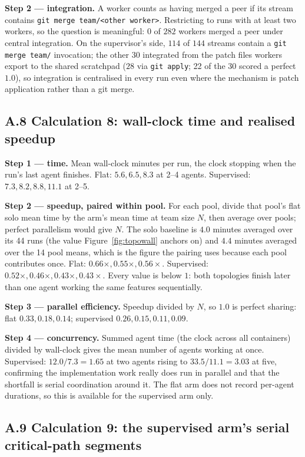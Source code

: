 \documentclass[11pt,a4paper]{article}
\begin{document}
\textbf{Step 2 --- integration.} A worker counts as having merged a peer if its stream contains \texttt{git merge team/<other worker>}. Restricting to runs with at least two workers, so the question is meaningful: $0$ of $282$ workers merged a peer under central integration. On the supervisor's side, $114$ of $144$ streams contain a \texttt{git merge team/} invocation; the other $30$ integrated from the patch files workers export to the shared scratchpad ($28$ via \texttt{git apply}; 22 of the 30 scored a perfect $1.0$), so integration is centralised in every run even where the mechanism is patch application rather than a git merge.

\subsection*{A.8 \quad Calculation 8: wall-clock time and realised speedup}

\textbf{Step 1 --- time.} Mean wall-clock minutes per run, the clock stopping when the run's last agent finishes. Flat: $5.6, 6.5, 8.3$ at 2--4 agents. Supervised: $7.3, 8.2, 8.8, 11.1$ at 2--5.

\textbf{Step 2 --- speedup, paired within pool.} For each pool, divide that pool's flat solo mean time by the arm's mean time at team size $N$, then average over pools; perfect parallelism would give $N$. The solo baseline is $4.0$ minutes averaged over its 44 runs (the value Figure~\ref{fig:topowall} anchors on) and $4.4$ minutes averaged over the 14 pool means, which is the figure the pairing uses because each pool contributes once. Flat: $0.66\times, 0.55\times, 0.56\times$. Supervised: $0.52\times, 0.46\times, 0.43\times, 0.43\times$. Every value is below $1$: both topologies finish later than one agent working the same features sequentially.

\textbf{Step 3 --- parallel efficiency.} Speedup divided by $N$, so $1.0$ is perfect sharing: flat $0.33, 0.18, 0.14$; supervised $0.26, 0.15, 0.11, 0.09$.

\textbf{Step 4 --- concurrency.} Summed agent time (the clock across all containers) divided by wall-clock gives the mean number of agents working at once. Supervised: $12.0/7.3 = 1.65$ at two agents rising to $33.5/11.1 = 3.03$ at five, confirming the implementation work really does run in parallel and that the shortfall is serial coordination around it. The flat arm does not record per-agent durations, so this is available for the supervised arm only.

\subsection*{A.9 \quad Calculation 9: the supervised arm's serial critical-path segments}
\end{document}
